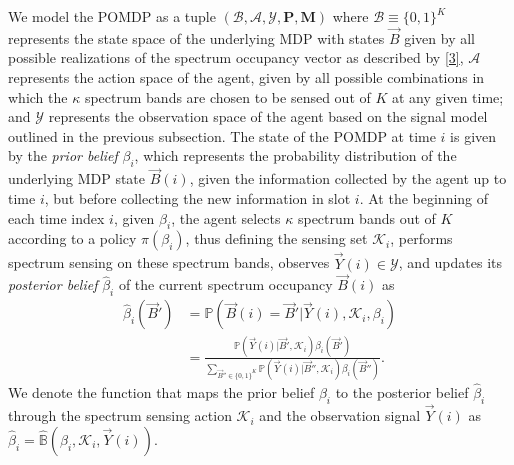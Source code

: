 \documentclass[10pt,twocolumn]{IEEEtran}
\begin{document}
We model the POMDP as a tuple $(\mathcal B,\mathcal{A},\mathcal{Y},\mathbf{P},\mathbf{M})$ where $\mathcal{B}\equiv\{0,1\}^K$ represents the state space of the underlying MDP with states $\vec{B}$ given by all possible realizations of the spectrum occupancy vector as described by \eqref{3}, $\mathcal{A}$ represents the action space of the agent, given by all possible combinations in which the $\kappa$ spectrum bands are chosen to be sensed out of $K$ at any given time; and $\mathcal{Y}$ represents the observation space of the agent based on the signal model outlined in the previous subsection. 
The state of the POMDP at time $i$ is given by the \emph{prior belief} $\beta_i$, which represents the probability distribution of the underlying MDP state $\vec{B}(i)$, given the information collected by the agent up to time $i$, but before collecting the new information in slot $i$. At the beginning of each time index $i$, given $\beta_i$, the agent selects $\kappa$ spectrum bands out of $K$ according to a policy $\pi(\beta_i)$, thus defining the sensing set $\mathcal K_i$, performs spectrum sensing  on these spectrum bands, observes $\vec{Y}(i)\in \mathcal{Y}$, and updates its \emph{posterior belief} $\hat{\beta}_i$ of the current spectrum occupancy $\vec{B}(i)$ as 
\begin{align}\label{11}
\hat\beta_i(\vec{B}') &= \mathbb{P}(\vec{B}(i) = \vec{B}'|\vec{Y}(i), \mathcal K_i, \beta_i)\\&=
\nonumber
\frac{\mathbb{P}(\vec{Y}(i)|\vec{B}', \mathcal{K}_i) \beta_i(\vec{B}')}{
\sum_{\vec{B}'' \in \{0,1\}^K} \mathbb{P}(\vec{Y}(i)|\vec{B}'', \mathcal{K}_i) \beta_i(\vec{B}'')}.
\end{align}
We denote the function that maps the prior belief $\beta_i$ to the posterior belief $\hat\beta_i$ through the spectrum sensing action $\mathcal K_i$ and the observation signal $\vec{Y}(i)$ as $\hat\beta_i=\hat{\mathbb B}(\beta_i, \mathcal K_i, \vec{Y}(i))$.
\end{document}

